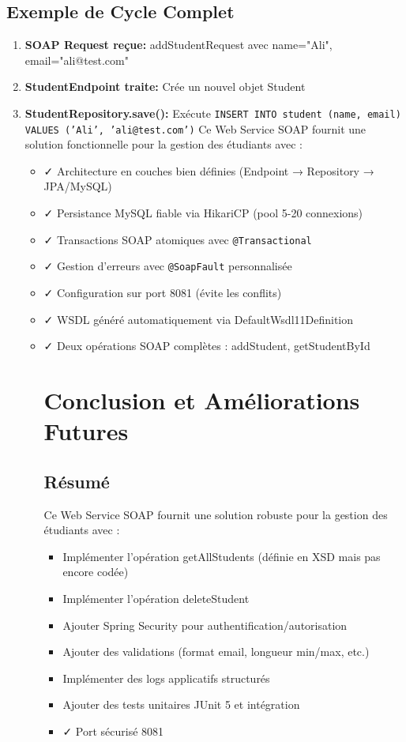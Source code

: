 \documentclass[12pt,a4paper]{report}
\begin{document}
\section{Exemple de Cycle Complet}

\begin{enumerate}
    \item \textbf{SOAP Request reçue:} addStudentRequest avec name="Ali", email="ali@test.com"
    \item \textbf{StudentEndpoint traite:} Crée un nouvel objet Student
    \item \textbf{StudentRepository.save():} Exécute \texttt{INSERT INTO student (name, email) VALUES ('Ali', 'ali@test.com')}
Ce Web Service SOAP fournit une solution fonctionnelle pour la gestion des étudiants avec :
\begin{itemize}
    \item ✓ Architecture en couches bien définies (Endpoint → Repository → JPA/MySQL)
    \item ✓ Persistance MySQL fiable via HikariCP (pool 5-20 connexions)
    \item ✓ Transactions SOAP atomiques avec \texttt{@Transactional}
    \item ✓ Gestion d'erreurs avec \texttt{@SoapFault} personnalisée
    \item ✓ Configuration sur port 8081 (évite les conflits)
    \item ✓ WSDL généré automatiquement via DefaultWsdl11Definition
    \item ✓ Deux opérations SOAP complètes : addStudent, getStudentById
\chapter{Conclusion et Améliorations Futures}

\section{Résumé}
Ce Web Service SOAP fournit une solution robuste pour la gestion des étudiants avec :
\begin{itemize}
    \item Implémenter l'opération getAllStudents (définie en XSD mais pas encore codée)
    \item Implémenter l'opération deleteStudent
    \item Ajouter Spring Security pour authentification/autorisation
    \item Ajouter des validations (format email, longueur min/max, etc.)
    \item Implémenter des logs applicatifs structurés
    \item Ajouter des tests unitaires JUnit 5 et intégration
    \item ✓ Port sécurisé 8081
\end{itemize}


\end{itemize}
\end{enumerate}
\end{document}
